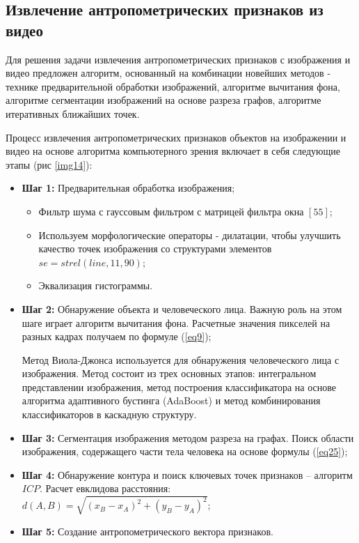 \subsection{Извлечение антропометрических признаков из видео}
Для решения задачи извлечения антропометрических признаков с изображения и видео предложен алгоритм, основанный на  комбинации новейших методов - технике предварительной обработки изображений, алгоритме вычитания фона, алгоритме сегментации изображений на основе разреза графов, алгоритме итеративных ближайших точек.

Процесс извлечения антропометрических признаков объектов на изображении и видео на основе алгоритма компьютерного зрения включает в себя следующие этапы (рис \ref{img14}):
\begin{itemize}
	\item \textbf{Шаг 1:} Предварительная обработка изображения;
	
	\begin{itemize}
		\item Фильтр шума с гауссовым фильтром с матрицей фильтра окна $\left[5 5\right]$;
		\item Используем морфологические операторы - дилатации, чтобы улучшить качество точек изображения со структурами элементов $se=strel\left(line,11,90\right)$;
		\item Эквализация гистограммы.
	\end{itemize}
	\item \textbf{Шаг 2:} Обнаружение объекта и человеческого лица. Важную роль на этом шаге играет алгоритм вычитания фона. Расчетные значения пикселей на разных кадрах получаем по формуле (\ref{eq9});
	
	Метод Виола-Джонса \cite{Violaj2001, Viola2004} используется для обнаружения человеческого лица с изображения. Метод состоит из трех основных этапов: интегральном представлении изображения, метод построения классификатора на основе алгоритма адаптивного бустинга (AdaBoost) и метод комбинирования классификаторов в каскадную структуру.
	\item \textbf{Шаг 3:} Сегментация изображения методом разреза на графах. Поиск области изображения, содержащего части тела человека на основе формулы (\ref{eq25});
	\item \textbf{Шаг 4:} Обнаружение контура и поиск ключевых точек признаков – алгоритм $ICP$. Расчет евклидова расстояния: $d\left(A,B\right) = \sqrt{\left(x_B - x_A\right)^2 + \left(y_B - y_A\right)^2}$;
	\item \textbf{Шаг 5:} Создание антропометрического вектора признаков.
\end{itemize}

